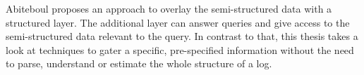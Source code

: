 \documentclass[\myrootdir/main.tex]{subfiles}
\begin{document}
Abiteboul proposes an approach to overlay the semi-structured data with a structured layer.
The additional layer can answer queries and give access to the semi-structured data relevant to the query.
In contrast to that, this thesis takes a look at techniques to gater a specific, pre-specified information without the need to parse, understand or estimate the whole structure of a log.
\end{document}
